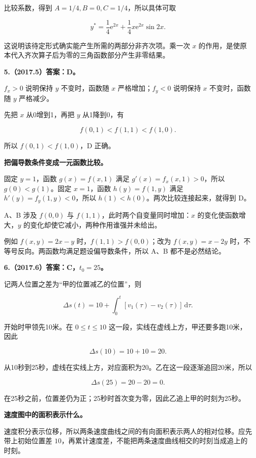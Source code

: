 \documentclass[UTF8,11pt,fontset=windows]{ctexart}
\begin{document}
比较系数，得到 $A=1/4,B=0,C=1/4$，所以具体可取

$$
y^*=\frac14\mathrm e^{2x}+\frac14x\mathrm e^{2x}\sin2x.
$$

这说明该待定形式确实能产生所需的两部分非齐次项。乘一次 $x$ 的作用，是使原本代入齐次算子后为零的三角函数部分产生非零结果。

\clearpage

\textbf{5.（2017.5）答案：D。}

$f_x>0$ 说明保持 $y$ 不变时，函数随 $x$ 严格增加；$f_y<0$ 说明保持 $x$ 不变时，函数随 $y$ 严格减少。

先把 $x$ 从0增到1，再把 $y$ 从1降到0，有

$$
f(0,1)<f(1,1)<f(1,0).
$$

所以 $f(0,1)<f(1,0)$，D 正确。

\textbf{把偏导数条件变成一元函数比较。}

固定 $y=1$，函数 $g(x)=f(x,1)$ 满足 $g'(x)=f_x(x,1)>0$，所以 $g(0)<g(1)$。固定 $x=1$，函数 $h(y)=f(1,y)$ 满足 $h'(y)=f_y(1,y)<0$，所以 $h(1)<h(0)$。两次比较连接起来，就得到 D。

A、B 涉及 $f(0,0)$ 与 $f(1,1)$，此时两个自变量同时增加：$x$ 的变化使函数增大，$y$ 的变化却使它减小，两种作用谁强并未给出。

例如 $f(x,y)=2x-y$ 时，$f(1,1)>f(0,0)$；改为 $f(x,y)=x-2y$ 时，不等号反向。两函数均满足题设偏导数条件，所以 A、B 都不是必然结论。

\clearpage

\textbf{6.（2017.6）答案：C，$t_0=25$。}

记两人位置之差为“甲的位置减乙的位置”，则

$$
\Delta s(t)=10+\int_0^t[v_1(\tau)-v_2(\tau)]\,\mathrm d\tau.
$$

开始时甲领先10米。在 $0\le t\le10$ 这一段，实线在虚线上方，甲还要多跑10米，因此

$$
\Delta s(10)=10+10=20.
$$

从10秒到25秒，虚线在实线上方，对应面积为20。乙在这一段逐渐追回20米，所以

$$
\Delta s(25)=20-20=0.
$$

在25秒之前，位置差仍为正；25秒时首次变为零，因此乙追上甲的时刻为25秒。

\textbf{速度图中的面积表示什么。}

速度积分表示位移，所以两条速度曲线之间的有向面积表示两人的相对位移。应先带上初始位置差 $10$，再累计速度差，不能把两条速度曲线相交的时刻当成追上的时刻。
\end{document}
